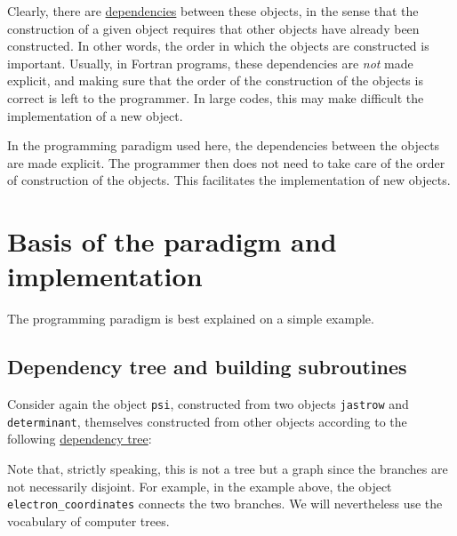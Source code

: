 \documentclass[letter,11pt]{article}
\newcommand\Def[1]{\underline{#1}}
\begin{document}
Clearly, there are \Def{dependencies} between these objects, in the sense that the construction of a given object requires that other objects have already been constructed. In other words, the order in which the objects are constructed is important. Usually, in Fortran programs, these dependencies are {\it not} made explicit, and making sure that the order of the construction of the objects is correct is left to the programmer. In large codes, this may make difficult the implementation of a new object.

In the programming paradigm used here, the dependencies between the objects are made explicit. The programmer then does not need to take care of the order of construction of the objects. This facilitates the implementation of new objects.

\section{Basis of the paradigm and implementation}

The programming paradigm is best explained on a simple example. 

\subsection{Dependency tree and building subroutines}

Consider again the object {\tt psi}, constructed from two objects {\tt jastrow} and {\tt determinant}, themselves constructed from other objects according to the following \Def{dependency tree}:


\begin{center}
\end{center}

Note that, strictly speaking, this is not a tree but a graph since the branches are not necessarily disjoint. For example, in the example above, the object {\tt electron_coordinates} connects the two branches. We will nevertheless use the vocabulary of computer trees.
\end{document}
